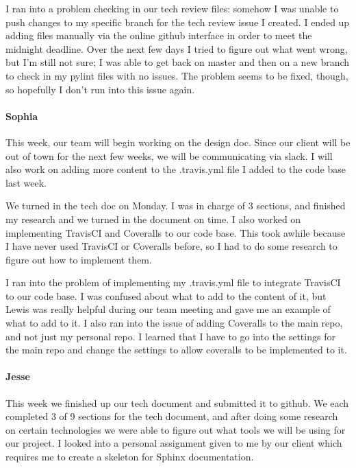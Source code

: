 \documentclass[onecolumn, draftclsnofoot,10pt, compsoc]{IEEEtran}
\begin{document}
\begin{flushleft}
 
I ran into a problem checking in our tech review files: somehow I was unable to push changes to my specific branch for the tech review issue I created. I ended up adding files manually via the online github interface in order to meet the midnight deadline. Over the next few days I tried to figure out what went wrong, but I'm still not sure; I was able to get back on master and then on a new branch to check in my pylint files with no issues. The problem seems to be fixed, though, so hopefully I don't run into this issue again.
 
\paragraph{Sophia}
 
This week, our team will begin working on the design doc. Since our client will be out of town for the next few weeks, we will be communicating via slack. I will also work on adding more content to the .travis.yml file I added to the code base last week.
 
 
We turned in the tech doc on Monday. I was in charge of 3 sections, and finished my research and we turned in the document on time. I also worked on implementing TravisCI and Coveralls to our code base. This took awhile because I have never used TravisCI or Coveralls before, so I had to do some research to figure out how to implement them.
 
 
I ran into the problem of implementing my .travis.yml file to integrate TravisCI to our code base. I was confused about what to add to the content of it, but Lewis was really helpful during our team meeting and gave me an example of what to add to it. I also ran into the issue of adding Coveralls to the main repo, and not just my personal repo. I learned that I have to go into the settings for the main repo and change the settings to allow coveralls to be implemented to it.
 
\paragraph{Jesse}
 
This week we finished up our tech document and submitted it to github. We each completed 3 of 9 sections for the tech document, and after doing some research on certain technologies we were able to figure out what tools we will be using for our project. I looked into a personal assignment given to me by our client which requires me to create a skeleton for Sphinx documentation.
 

\end{flushleft}
\end{document}
